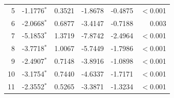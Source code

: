 \begin{longtable}{rrrrrr}
5 & -1.1776$^{*}$ & 0.3521 & -1.8678 & -0.4875 & $<$0.001 \\
6 & -2.0668$^{*}$ & 0.6877 & -3.4147 & -0.7188 & 0.003 \\
7 & -5.1853$^{*}$ & 1.3719 & -7.8742 & -2.4964 & $<$0.001 \\
8 & -3.7718$^{*}$ & 1.0067 & -5.7449 & -1.7986 & $<$0.001 \\
9 & -2.4907$^{*}$ & 0.7148 & -3.8916 & -1.0898 & $<$0.001 \\
10 & -3.1754$^{*}$ & 0.7440 & -4.6337 & -1.7171 & $<$0.001 \\
11 & -2.3552$^{*}$ & 0.5265 & -3.3871 & -1.3234 & $<$0.001 \\
\end{longtable}
